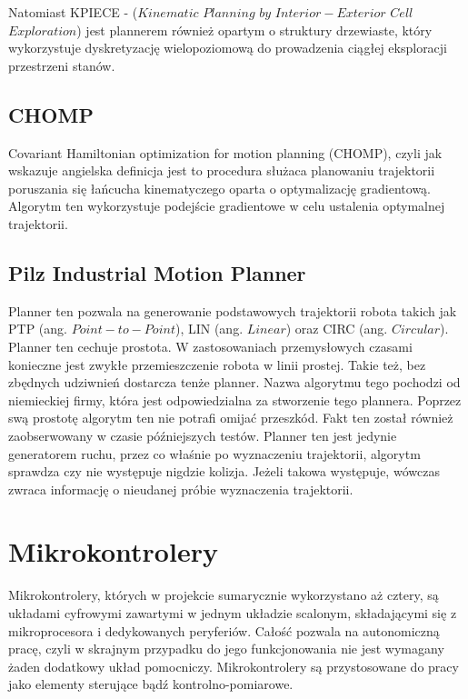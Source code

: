 Natomiast KPIECE - ($Kinematic$ $Planning$ $by$ $Interior-Exterior$ $Cell$ $Exploration$) jest plannerem również opartym o struktury drzewiaste, który wykorzystuje dyskretyzację wielopoziomową do prowadzenia ciągłej eksploracji przestrzeni stanów. 

\cite{MoIt_plan}

\subsection{CHOMP}

Covariant Hamiltonian optimization for motion planning (CHOMP), czyli jak wskazuje angielska definicja jest to procedura służaca planowaniu trajektorii poruszania się łańcucha kinematyczego oparta o optymalizację gradientową. Algorytm ten wykorzystuje podejście gradientowe w celu ustalenia optymalnej trajektorii. \cite{CHOMP}

\subsection{Pilz Industrial Motion Planner}

Planner ten pozwala na generowanie podstawowych trajektorii robota takich jak PTP (ang. $Point-to-Point$), LIN (ang. $Linear$) oraz CIRC (ang. $Circular$). Planner ten cechuje prostota. W zastosowaniach przemysłowych czasami konieczne jest zwykłe przemieszczenie robota w linii prostej. Takie też, bez zbędnych udziwnień dostarcza tenże planner. Nazwa algorytmu tego pochodzi od niemieckiej firmy, która jest odpowiedzialna za stworzenie tego plannera. Poprzez swą prostotę algorytm ten nie potrafi omijać przeszkód. Fakt ten został również zaobserwowany w czasie późniejszych testów. Planner ten jest jedynie generatorem ruchu, przez co właśnie po wyznaczeniu trajektorii, algorytm sprawdza czy nie występuje nigdzie kolizja. Jeżeli takowa występuje, wówczas zwraca informację o nieudanej próbie wyznaczenia trajektorii.  \cite{Pilz_AG}


\section{Mikrokontrolery}
\label{sec:narzedzia}

Mikrokontrolery, których w projekcie sumarycznie wykorzystano aż cztery, są układami cyfrowymi zawartymi w jednym układzie scalonym, składającymi się z mikroprocesora i dedykowanych peryferiów. Całość pozwala na autonomiczną pracę, czyli w skrajnym przypadku do jego funkcjonowania nie jest wymagany żaden dodatkowy układ pomocniczy. Mikrokontrolery są przystosowane do pracy jako elementy sterujące bądź kontrolno-pomiarowe.

